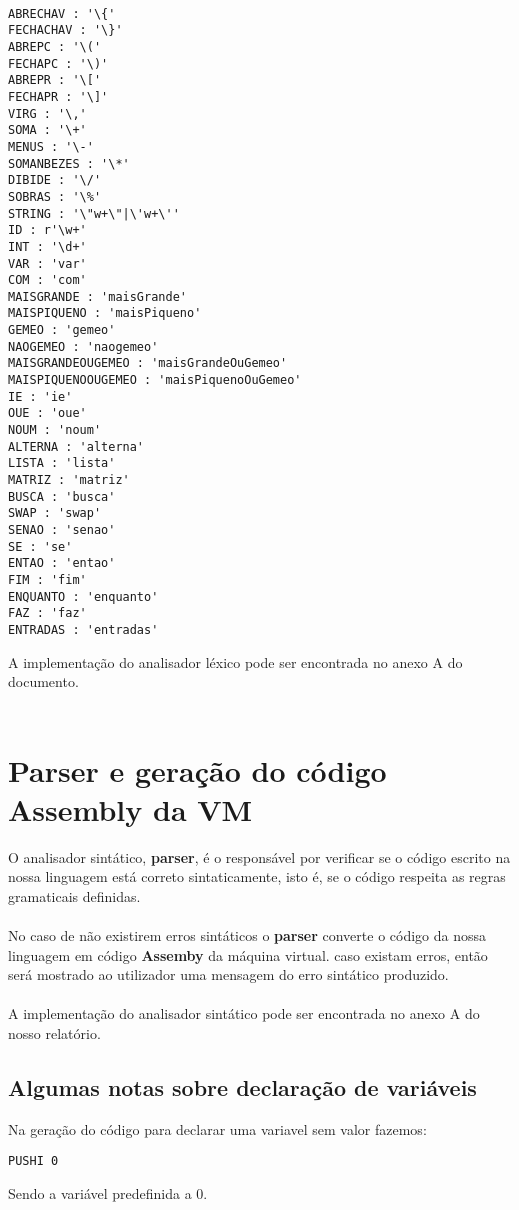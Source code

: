 \documentclass[11pt,a4paper]{report}%
\begin{document}
\begin{verbatim}

ABRECHAV : '\{'
FECHACHAV : '\}'
ABREPC : '\('
FECHAPC : '\)'
ABREPR : '\['
FECHAPR : '\]'
VIRG : '\,'
SOMA : '\+'
MENUS : '\-'
SOMANBEZES : '\*'
DIBIDE : '\/'
SOBRAS : '\%'
STRING : '\"w+\"|\'w+\''
ID : r'\w+'
INT : '\d+'
VAR : 'var'
COM : 'com'
MAISGRANDE : 'maisGrande'
MAISPIQUENO : 'maisPiqueno'
GEMEO : 'gemeo'
NAOGEMEO : 'naogemeo'
MAISGRANDEOUGEMEO : 'maisGrandeOuGemeo'
MAISPIQUENOOUGEMEO : 'maisPiquenoOuGemeo'
IE : 'ie'
OUE : 'oue'
NOUM : 'noum'
ALTERNA : 'alterna'
LISTA : 'lista'
MATRIZ : 'matriz'
BUSCA : 'busca'
SWAP : 'swap'
SENAO : 'senao'
SE : 'se'
ENTAO : 'entao'
FIM : 'fim'
ENQUANTO : 'enquanto'
FAZ : 'faz'
ENTRADAS : 'entradas'
\end{verbatim}

A implementação do analisador léxico pode ser encontrada no anexo A do documento. 
\\ \\


\section{Parser e geração do código Assembly da VM}
O analisador sintático, \textbf{parser}, é  o responsável por verificar se o código escrito na nossa linguagem está correto sintaticamente, isto é, se  o código respeita as regras gramaticais definidas. \\ \\

No caso de não existirem erros sintáticos o \textbf{parser} converte o código da nossa linguagem em código \textbf{Assemby} da máquina virtual. caso existam erros, então será mostrado ao utilizador uma mensagem do erro sintático produzido. \\ \\
A implementação do analisador sintático pode ser encontrada no anexo A do nosso relatório.


\subsection{Algumas notas sobre declaração de variáveis}

Na geração do código para declarar uma variavel sem valor fazemos:
\begin{lstlisting}
PUSHI 0    
\end{lstlisting}
Sendo a variável predefinida a 0.\\
\end{document}
